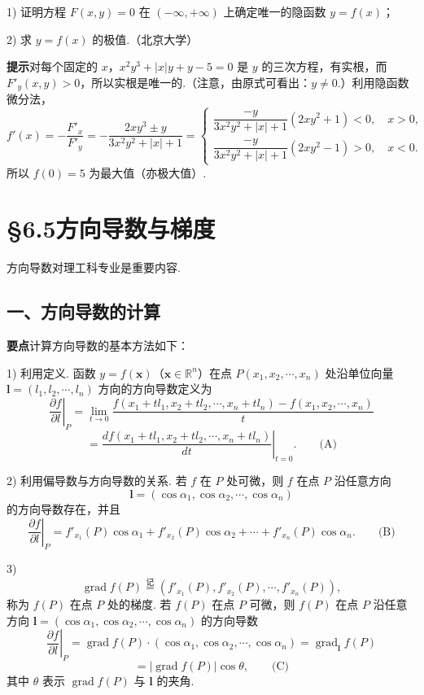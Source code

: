 \documentclass[UTF8,12pt,a4paper,fontset=fandol]{ctexart}
\begin{document}
1) 证明方程 $F(x,y)=0$ 在 $(-\infty,+\infty)$ 上确定唯一的隐函数 $y=f(x)$；

2) 求 $y=f(x)$ 的极值.（北京大学）

\noindent\textbf{提示}\quad 对每个固定的 $x$，$x^2y^3+|x|y+y-5=0$ 是 $y$ 的三次方程，有实根，而 $F'_y(x,y)>0$，所以实根是唯一的.（注意，由原式可看出：$y\ne0$.）利用隐函数微分法，
\[
  f'(x)=-\frac{F'_x}{F'_y}
  =
  -\frac{2xy^3\pm y}{3x^2y^2+|x|+1}
  =
  \begin{cases}
    \dfrac{-y}{3x^2y^2+|x|+1}(2xy^2+1)<0,\quad x>0,\\[6pt]
    \dfrac{-y}{3x^2y^2+|x|+1}(2xy^2-1)>0,\quad x<0.
  \end{cases}
\]
所以 $f(0)=5$ 为最大值（亦极大值）.

\section*{§6.5\quad 方向导数与梯度}

方向导数对理工科专业是重要内容.

\subsection*{一、方向导数的计算}

\noindent\textbf{要点}\quad 计算方向导数的基本方法如下：

1) 利用定义. 函数 $y=f(\mathbf x)$（$\mathbf x\in\mathbb R^n$）在点
$P(x_1,x_2,\cdots,x_n)$ 处沿单位向量
$\mathbf l=(l_1,l_2,\cdots,l_n)$ 方向的方向导数定义为
\[
\left.\frac{\partial f}{\partial l}\right|_P
=\lim_{t\to0}
\frac{f(x_1+tl_1,x_2+tl_2,\cdots,x_n+tl_n)-f(x_1,x_2,\cdots,x_n)}{t}
\]
\[
=
\left.
\frac{d f(x_1+tl_1,x_2+tl_2,\cdots,x_n+tl_n)}{dt}
\right|_{t=0}. \qquad\text{(A)}
\]

2) 利用偏导数与方向导数的关系. 若 $f$ 在 $P$ 处可微，则 $f$ 在点 $P$ 沿任意方向
\[
  \mathbf l=(\cos\alpha_1,\cos\alpha_2,\cdots,\cos\alpha_n)
\]
的方向导数存在，并且
\[
\left.\frac{\partial f}{\partial l}\right|_P
=f'_{x_1}(P)\cos\alpha_1+f'_{x_2}(P)\cos\alpha_2+\cdots+f'_{x_n}(P)\cos\alpha_n. \qquad\text{(B)}
\]

3)
\[
  \operatorname{grad} f(P)\overset{\text{记}}{=}
  (f'_{x_1}(P),f'_{x_2}(P),\cdots,f'_{x_n}(P)),
\]
称为 $f(P)$ 在点 $P$ 处的梯度. 若 $f(P)$ 在点 $P$ 可微，则 $f(P)$ 在点 $P$ 沿任意方向
$\mathbf l=(\cos\alpha_1,\cos\alpha_2,\cdots,\cos\alpha_n)$ 的方向导数
\[
\left.\frac{\partial f}{\partial l}\right|_P
=\operatorname{grad} f(P)\cdot(\cos\alpha_1,\cos\alpha_2,\cdots,\cos\alpha_n)
=\operatorname{grad}_{\mathbf l}f(P)
\]
\[
  =|\operatorname{grad} f(P)|\cos\theta, \qquad\text{(C)}
\]
其中 $\theta$ 表示 $\operatorname{grad}f(P)$ 与 $\mathbf l$ 的夹角.
\end{document}
